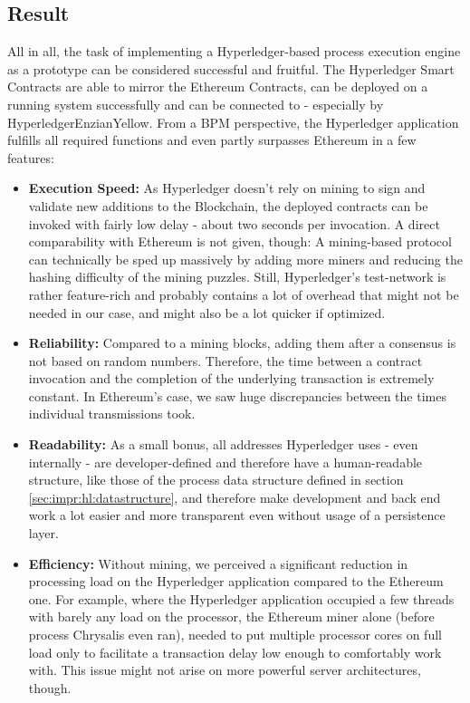 \subsection{Result}
\label{sec:impr:hl:result}

All in all, the task of implementing a Hyperledger-based process execution engine as a prototype can be considered successful and fruitful. The Hyperledger Smart Contracts are able to mirror the Ethereum Contracts, can be deployed on a running system successfully and can be connected to - especially by HyperledgerEnzianYellow. From a BPM perspective, the Hyperledger application fulfills all required functions and even partly surpasses Ethereum in a few features:
\begin{itemize}
    \item \textbf{Execution Speed:} As Hyperledger doesn't rely on mining to sign and validate new additions to the Blockchain, the deployed contracts can be invoked with fairly low delay - about two seconds per invocation. A direct comparability with Ethereum is not given, though: A mining-based protocol can technically be sped up massively by adding more miners and reducing the hashing difficulty of the mining puzzles. Still, Hyperledger's test-network is rather feature-rich and probably contains a lot of overhead that might not be needed in our case, and might also be a lot quicker if optimized.
    \item \textbf{Reliability:} Compared to a mining blocks, adding them after a consensus is not based on random numbers. Therefore, the time between a contract invocation and the completion of the underlying transaction is extremely constant. In Ethereum's case, we saw huge discrepancies between the times individual transmissions took.
    \item \textbf{Readability:} As a small bonus, all addresses Hyperledger uses - even internally - are developer-defined and therefore have a human-readable structure, like those of the process data structure defined in section \ref{sec:impr:hl:datastructure}, and therefore make development and back end work a lot easier and more transparent even without usage of a persistence layer.
    \item \textbf{Efficiency:} Without mining, we perceived a significant reduction in processing load on the Hyperledger application compared to the Ethereum one. For example, where the Hyperledger application occupied a few threads with barely any load on the processor, the Ethereum miner alone (before process Chrysalis even ran), needed to put multiple processor cores on full load only to facilitate a transaction delay low enough to comfortably work with. This issue might not arise on more powerful server architectures, though.
\end{itemize}